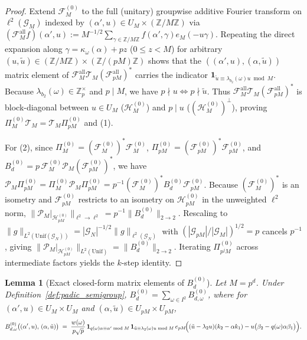 \documentclass[11pt,a4paper]{article}
\numberwithin{equation}{section}
\newtheorem{lemma}[theorem]{Lemma}
\theoremstyle{definition}
\theoremstyle{remark}
\newcommand{\Z}{\mathbb{Z}}
\newcommand{\cG}{\mathcal{G}}
\newcommand{\cF}{\mathcal{F}}
\newcommand{\cH}{\mathcal{H}}
\newcommand{\cT}{\mathcal{T}}
\newcommand{\cP}{\mathcal{P}}
\newcommand{\Unif}{\mathrm{Unif}}
\begin{document}
\begin{proof}
Extend $\cF_M^{(0)}$ to the full (unitary) groupwise additive Fourier transform on $\ell^2(\cG_M)$ indexed by $(\alpha', u) \in U_M \times (\Z/M\Z)$ via $(\cF_M^{\mathrm{all}} f)(\alpha', u) := M^{-1/2}\sum_{\gamma \in \Z/M\Z} f(\alpha', \gamma) e_M(-u\gamma)$. Repeating the direct expansion along $\gamma = \kappa_\omega(\alpha) + p z$ ($0 \le z < M$) for arbitrary $(u, \tilde u) \in (\Z/M\Z) \times (\Z/(pM)\Z)$ shows that the $((\alpha', u), (\alpha, \tilde u))$ matrix element of $\cF_M^{\mathrm{all}} \cT_M (\cF_{pM}^{\mathrm{all}})^*$ carries the indicator $\mathbf{1}_{\tilde u \equiv \lambda_{b_2}(\omega)u \bmod M}$. Because $\lambda_{b_2}(\omega) \in \Z_p^\times$ and $p \mid M$, we have $p \nmid u \iff p \nmid \tilde u$. Thus $\cF_M^{\mathrm{all}} \cT_M (\cF_{pM}^{\mathrm{all}})^*$ is block-diagonal between $u \in U_M$ ($\cH_M^{(0)}$) and $p \mid u$ ($(\cH_M^{(0)})^\perp$), proving $\Pi_M^{(0)}\cT_M = \cT_M\Pi_{pM}^{(0)}$ and (1).

For (2), since $\Pi_M^{(0)} = (\cF_M^{(0)})^*\cF_M^{(0)}$, $\Pi_{pM}^{(0)} = (\cF_{pM}^{(0)})^*\cF_{pM}^{(0)}$, and $B_d^{(0)} = p\,\cF_M^{(0)}\cP_M(\cF_{pM}^{(0)})^*$, we have $\cP_M\Pi_{pM}^{(0)} = \Pi_M^{(0)}\cP_M\Pi_{pM}^{(0)} = p^{-1}(\cF_M^{(0)})^* B_d^{(0)}\cF_{pM}^{(0)}$. Because $(\cF_M^{(0)})^*$ is an isometry and $\cF_{pM}^{(0)}$ restricts to an isometry on $\cH_{pM}^{(0)}$ in the unweighted $\ell^2$ norm, $\|\cP_M|_{\cH_{pM}^{(0)}}\|_{\ell^2 \to \ell^2} = p^{-1}\|B_d^{(0)}\|_{2\to 2}$. Rescaling to $\|g\|_{L^2(\Unif(\cG_N))} = |\cG_N|^{-1/2}\|g\|_{\ell^2(\cG_N)}$ with $(|\cG_{pM}|/|\cG_M|)^{1/2} = p$ cancels $p^{-1}$, giving $\|\cP_M|_{\cH_{pM}^{(0)}}\|_{L^2(\Unif)} = \|B_d^{(0)}\|_{2\to 2}$. Iterating $\Pi_{p^j M}^{(0)}$ across intermediate factors yields the $k$-step identity.
\end{proof}

\begin{lemma}[Exact closed-form matrix elements of $B_d^{(0)}$]\label{lem:B_matrix}
Let $M = p^d$. Under Definition~\ref{def:padic_semigroup}, $B_d^{(0)} = \sum_{\omega \in I^2} B_{d,\omega}^{(0)}$, where for $(\alpha', u) \in U_M \times U_M$ and $(\alpha, \tilde u) \in U_{pM} \times U_{pM}$,
\begin{equation}\label{eq:B_closed}
B_{d,\omega}^{(0)}\bigl((\alpha', u),\, (\alpha, \tilde u)\bigr) \;=\; \frac{w(\omega)}{p\sqrt{p}}\,\mathbf{1}_{q(\omega)\alpha \equiv \alpha' \bmod M}\,\mathbf{1}_{\tilde u \equiv \lambda_2(\omega)u \bmod M}\, e_{pM}\!\Bigl((\tilde u - \lambda_2 u)(k_2 - \alpha k_1) - u\bigl(\beta_2 - q(\omega)\alpha\beta_1\bigr)\Bigr).
\end{equation}
\end{lemma}
\end{document}

